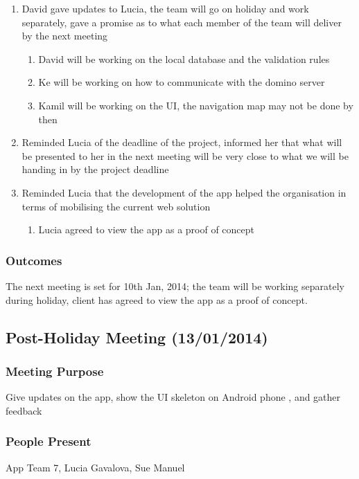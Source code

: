 \documentclass[12pt,a4paper,oneside,titlepage]{article}
\begin{document}
\begin{enumerate}
\begin{enumerate}
	\end{enumerate}
	\item David gave updates to Lucia, the team will go on holiday and work separately, gave a promise as to what each member of the team will deliver by the next meeting 
	\begin{enumerate}
		\item David will be working on the local database and the validation rules 
		\item Ke will be working on how to communicate with the domino server 
		\item Kamil will be working on the UI, the navigation map may not be done by then 
	\end{enumerate}
	\item Reminded Lucia of the deadline of the project, informed her that what will be presented to her in the next meeting will be very close to what we will be handing in by the project deadline 
	\item Reminded Lucia that the development of the app helped the organisation in terms of mobilising the current web solution 
	\begin{enumerate}
		\item Lucia agreed to view the app as a proof of concept
	\end{enumerate}
\end{enumerate}


\subsubsection{Outcomes} 
The next meeting is set for 10th Jan, 2014; the team will be working separately during holiday, client has agreed to view the app as a proof of concept.

\subsection{Post-Holiday Meeting (13/01/2014)}

\subsubsection{Meeting Purpose}
Give updates on the app, show the UI skeleton on Android phone , and gather feedback

\subsubsection{People Present}
App Team 7, Lucia Gavalova, Sue Manuel
\end{document}
